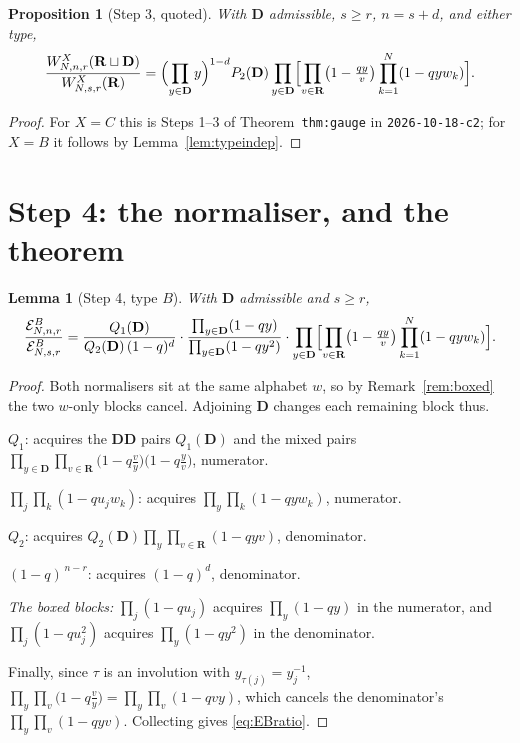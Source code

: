 \documentclass[11pt]{article}
\newtheorem{lem}[thm]{Lemma}
\newtheorem{prop}[thm]{Proposition}
\theoremstyle{definition}
\newcommand{\bD}{\mathbf{D}}
\newcommand{\bR}{\mathbf{R}}
\newcommand{\EB}{\mathcal{E}^{B}}
\begin{document}
\begin{prop}[Step 3, quoted]\label{prop:step3}
With $\bD$ admissible, $s\ge r$, $n=s+d$, and either type,
\begin{equation}\label{eq:Fratio}
  \frac{W^{X}_{N,n,r}(\bR\sqcup\bD)}{W^{X}_{N,s,r}(\bR)}
  =\Bigl(\prod_{y\in\bD}y\Bigr)^{1-d} P_2(\bD)
   \prod_{y\in\bD}\Bigl[\prod_{v\in\bR}\bigl(1-\tfrac{qy}{v}\bigr)
                        \prod_{k=1}^{N}(1-qyw_k)\Bigr].
\end{equation}
\end{prop}

\begin{proof}
For $X=C$ this is Steps 1--3 of Theorem~\texttt{thm:gauge} in
\texttt{2026-10-18-c2}; for $X=B$ it follows by Lemma~\ref{lem:typeindep}.
\end{proof}

\section{Step 4: the normaliser, and the theorem}
\label{sec:thm}

\begin{lem}[Step 4, type $B$]\label{lem:step4}
With $\bD$ admissible and $s\ge r$,
\begin{equation}\label{eq:EBratio}
  \frac{\EB_{N,n,r}}{\EB_{N,s,r}}
  =\frac{Q_1(\bD)}{Q_2(\bD)\,(1-q)^{d}}
   \cdot\frac{\prod_{y\in\bD}(1-qy)}{\prod_{y\in\bD}(1-qy^{2})}
   \cdot\prod_{y\in\bD}\Bigl[\prod_{v\in\bR}\bigl(1-\tfrac{qy}{v}\bigr)
                        \prod_{k=1}^{N}(1-qyw_k)\Bigr].
\end{equation}
\end{lem}

\begin{proof}
Both normalisers sit at the same alphabet $w$, so by Remark~\ref{rem:boxed} the
two $w$-only blocks cancel.  Adjoining $\bD$ changes each remaining block thus.

$Q_1$: acquires the $\bD\bD$ pairs $Q_1(\bD)$ and the mixed pairs
$\prod_{y\in\bD}\prod_{v\in\bR}\bigl(1-q\tfrac{v}{y}\bigr)
 \bigl(1-q\tfrac{y}{v}\bigr)$, numerator.

$\prod_j\prod_k(1-qu_jw_k)$: acquires $\prod_{y}\prod_{k}(1-qyw_k)$, numerator.

$Q_2$: acquires $Q_2(\bD)\prod_{y}\prod_{v\in\bR}(1-qyv)$, denominator.

$(1-q)^{\,n-r}$: acquires $(1-q)^{d}$, denominator.

\emph{The boxed blocks:} $\prod_j(1-qu_j)$ acquires $\prod_{y}(1-qy)$ in the
numerator, and $\prod_j(1-qu_j^{2})$ acquires $\prod_{y}(1-qy^{2})$ in the
denominator.

Finally, since $\tau$ is an involution with $y_{\tau(j)}=y_j^{-1}$,
$\prod_{y}\prod_{v}\bigl(1-q\tfrac{v}{y}\bigr)=\prod_{y}\prod_{v}(1-qvy)$, which
cancels the denominator's $\prod_{y}\prod_{v}(1-qyv)$.  Collecting gives
\eqref{eq:EBratio}.
\end{proof}
\end{document}

